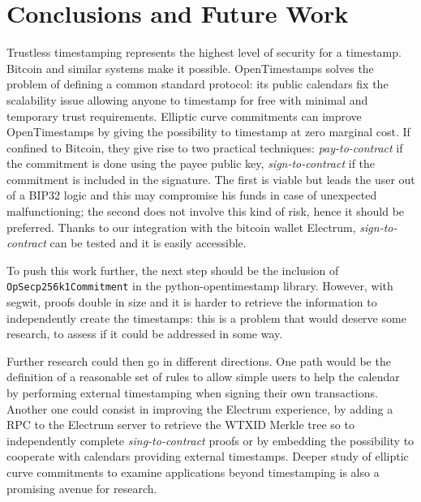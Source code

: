 \chapter{Conclusions and Future Work}
\label{chpr:conclusions}
Trustless timestamping represents the highest level of security for a timestamp. 
Bitcoin and similar systems make it possible.
OpenTimestamps solves the problem of defining a common standard protocol: its public calendars fix the scalability issue allowing anyone to timestamp for free with minimal and temporary trust requirements.
Elliptic curve commitments can improve OpenTimestamps by giving the possibility to timestamp at zero marginal cost. 
If confined to Bitcoin, they give rise to two practical techniques: \textit{pay-to-contract} if the commitment is done using the payee public key, \textit{sign-to-contract} if the commitment is included in the signature. 
The first is viable but leads the user out of a BIP32 logic and this may compromise his funds in case of unexpected malfunctioning; the second does not involve this kind of risk, hence it should be preferred. 
Thanks to our integration with the bitcoin wallet Electrum, \textit{sign-to-contract} can be tested and it is easily accessible.

To push this work further, the next step should be the inclusion of \verb|OpSecp256k1Commitment| in the python-opentimestamp library.
However, with segwit, proofs double in size and it is harder to retrieve the information to independently create the timestamps: this is a problem that would deserve some research, to assess if it could be addressed in some way.

Further research could then go in different directions.
One path would be the definition of a reasonable set of rules to allow simple users to help the calendar by performing external timestamping when signing their own transactions.
Another one could consist in improving the Electrum experience, by adding a RPC to the Electrum server to retrieve the WTXID Merkle tree so to independently complete \textit{sing-to-contract} proofs or by embedding the possibility to cooperate with calendars providing external timestamps.
Deeper study of elliptic curve commitments to examine applications beyond timestamping \cite{TapRoot} is also a promising avenue for research.

